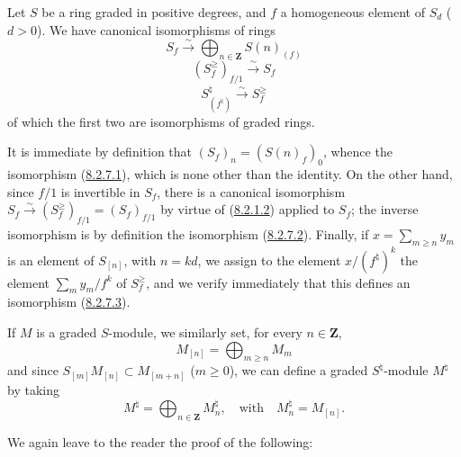 
\begin{lemma}[8.2.7]
\label{II.8.2.7}
Let $S$ be a ring graded in positive degrees, and $f$ a homogeneous element of
$S_d$ ($d>0$). We have canonical isomorphisms of rings
\begin{equation}
\label{II.8.2.7.1}
  S_f\xrightarrow{\sim}\bigoplus_{n\in\mathbf{Z}}S(n)_{(f)}
\tag{8.2.7.1}
\end{equation}
\begin{equation}
\label{II.8.2.7.2}
  (S_f^{\geq})_{f/1}\xrightarrow{\sim}S_f
\tag{8.2.7.2}
\end{equation}
\begin{equation}
\label{II.8.2.7.3}
  S^\natural_{(f^\natural)}\xrightarrow{\sim}S_f^{\geq}
\tag{8.2.7.3}
\end{equation}
of which the first two are isomorphisms of graded rings.
\end{lemma}

It is immediate by definition that
$(S_f)_n=(S(n)_f)_0$, whence the isomorphism
(\hyperref[II.8.2.7.1]{8.2.7.1}), which is none other than the identity. On the other
hand, since $f/1$ is invertible in $S_f$, there is a canonical isomorphism
$S_f\xrightarrow{\sim}(S_f^{\geq})_{f/1}=(S_f)_{f/1}$ by virtue of
(\hyperref[II.8.2.1.2]{8.2.1.2}) applied to $S_f$; the inverse
isomorphism is by definition the isomorphism
(\hyperref[II.8.2.7.2]{8.2.7.2}). Finally, if
$x=\sum_{m\geq n}y_m$ is an element of $S_{[n]}$, with $n=kd$, we assign
to the element $x/(f^\natural)^k$ the element
$\sum_m y_m/f^k$ of $S_f^{\geq}$, and we verify immediately that this defines an
isomorphism (\hyperref[II.8.2.7.3]{8.2.7.3}).

\begin{env}[8.2.8]
\label{II.8.2.8}
If $M$ is a graded $S$-module, we similarly set, for every $n\in\mathbf{Z}$,
\begin{equation}
\label{II.8.2.8.1}
  M_{[n]}=\bigoplus_{m\geq n}M_m
\tag{8.2.8.1}
\end{equation}
and since $S_{[m]}M_{[n]}\subset M_{[m+n]}$ ($m\geq0$), we can define a
graded $S^\natural$-module $M^\natural$ by taking
\begin{equation}
\label{II.8.2.8.2}
  M^\natural=\bigoplus_{n\in\mathbf{Z}}M_n^\natural,
  \quad\text{with}\quad M_n^\natural=M_{[n]}.
\tag{8.2.8.2}
\end{equation}
\end{env}

We again leave to the reader the proof of the following:

